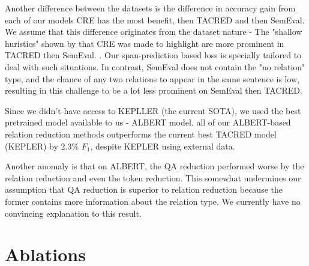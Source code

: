 \documentclass[11pt]{article}
\begin{document}
Another difference between the datasets is the difference in accuracy gain from each of our models CRE has the most benefit, then TACRED and then SemEval. We assume that this difference originates from the dataset nature - The "shallow huristics" shown by \cite{Rosenman2020} that CRE was made to highlight are more prominent in TACRED then SemEval. . Our span-prediction based loss is specially tailored to deal with such situations. In contrast, SemEval does not contain the "no relation" type, and the chance of any two relations to appear in the same sentence is low, resulting in this challenge to be a lot less prominent on SemEval then TACRED. 

Since we didn't have access to KEPLLER (the current SOTA), we used the best pretrained model available to us - ALBERT model. all of our ALBERT-based relation reduction methods outperforms the current best TACRED model (KEPLER) by 2.3\% $F_1$, despite KEPLER using external data. 

Another anomaly is that on ALBERT, the QA reduction performed worse by the relation reduction and even the token reduction. This somewhat undermines our assumption that QA reduction is superior to relation reduction because the former contains more information about the relation type. We currently have no convincing explanation to this result. 




\section{Ablations} \label{sec:ablation}

\begin{table}[t]
\caption{{\bf Importance of bidirectional questions.} The SP$_{question,ALBERT}$ model with two questions combined via OR (full setup), vs. a single question.  Asking two questions instead of one significantly increase the model performance.}
\label{tab:ablation}
\end{table}
\end{document}
